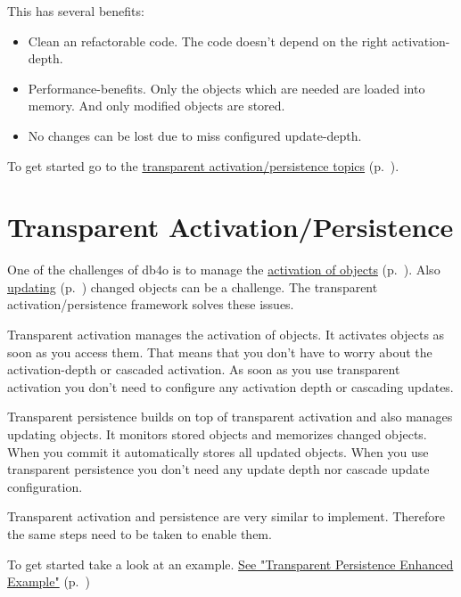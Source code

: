 This has several benefits:

\begin{itemize}
\item Clean an refactorable code. The code doesn't depend on the right activation-depth.
\item Performance-benefits. Only the objects which are needed are loaded into memory. And only modified objects are stored.
\item No changes can be lost due to miss configured update-depth.
\end{itemize}

To get started go to the \hyperref[ref:basics-transparent-persistence]{transparent activation/persistence topics} (p.~\pageref{ref:basics-transparent-persistence}).

\section{Transparent Activation/Persistence}
\label{ref:basics-transparent-persistence}

One of the challenges of db4o is to manage the \hyperref[ref:basics-activation]{activation of objects} (p.~\pageref{ref:basics-activation}). Also \hyperref[ref:basics-update-concept]{updating} (p.~\pageref{ref:basics-update-concept}) changed objects can be a challenge. The transparent activation/persistence framework solves these issues.

Transparent activation manages the activation of objects. It activates objects as soon as you access them. That means that you don't have to worry about the activation-depth or cascaded activation. As soon as you use transparent activation you don't need to configure any activation depth or cascading updates.

Transparent persistence builds on top of transparent activation and also manages updating objects. It monitors stored objects and memorizes changed objects. When you commit it automatically stores all updated objects. When you use transparent persistence you don't need any update depth nor cascade update configuration.

Transparent activation and persistence are very similar to implement. Therefore the same steps need to be taken to enable them.

To get started take a look at an example. \hyperref[ref:basics-transparentpersistence-ta-enhanced-example]{See "Transparent Persistence Enhanced Example"} (p.~\pageref{ref:basics-transparentpersistence-ta-enhanced-example})

